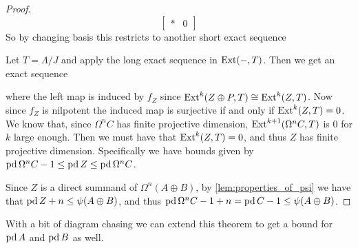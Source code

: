\begin{theorem}
\begin{proof}
$$\begin{bmatrix}
		* & 0
		\end{bmatrix} $$
		So by changing basis this restricts to another short exact sequence
		\begin{center}
		\end{center}
		Let $T = \Lambda/J$ and apply the long exact sequence in $\operatorname{Ext}(-, T)$. Then we get an exact sequence
		\begin{center}
		\end{center}
		where the left map is induced by $f_Z$ since $\operatorname{Ext}^k(Z \oplus P, T) \cong \operatorname{Ext}^k(Z, T)$. Now since $f_Z$ is nilpotent the induced map is surjective if and only if $\operatorname{Ext}^k(Z, T)=0$. We know that, since $\Omega^nC$ has finite projective dimension, $\operatorname{Ext}^{k+1}(\Omega^n C, T)$ is 0 for $k$ large enough. Then we must have that $\operatorname{Ext}^k(Z, T)=0$, and thus $Z$ has finite projective dimension. Specifically we have bounds given by $\operatorname{pd}\Omega^n C -1 \leq \operatorname{pd} Z \leq \operatorname{pd}\Omega^n C$.
		
		Since $Z$ is a direct summand of $\Omega^n (A\oplus B)$, by \cref{lem:properties_of_psi} we have that $\operatorname{pd} Z + n \leq \psi(A \oplus B)$, and thus $\operatorname{pd} \Omega^n C - 1 + n = \operatorname{pd} C - 1 \leq \psi(A \oplus B)$.
	\end{proof}
\end{theorem}

With a bit of diagram chasing we can extend this theorem to get a bound for $\operatorname{pd} A$ and $\operatorname{pd} B$ as well.


